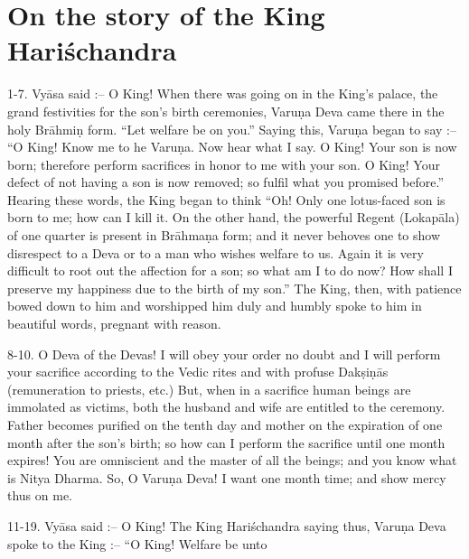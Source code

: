 \chapter{On the story of the King Hari\'schandra}

1-7. Vy\=asa said :-- O King! When there was going on in the King's palace, the grand festivities for the son's birth ceremonies, Varu\d{n}a Deva came there in the holy Br\=ahmi\d{n} form. ``Let welfare be on you.'' Saying this, Varu\d{n}a began to say :-- ``O King! Know me to he Varu\d{n}a. Now hear what I say. O King! Your son is now born; therefore perform sacrifices in honor to me with your son. O King! Your defect of not having a son is now removed; so fulfil what you promised before.'' Hearing these words, the King began to think ``Oh! Only one lotus-faced son is born to me; how can I kill it. On the other hand, the powerful Regent (Lokap\=ala) of one quarter is present in Br\=ahma\d{n}a form; and it never behoves one to show disrespect to a Deva or to a man who wishes welfare to us. Again it is very difficult to root out the affection for a son; so what am I to do now? How shall I preserve my happiness due to the birth of my son.'' The King, then, with patience bowed down to him and worshipped him duly and humbly spoke to him in beautiful words, pregnant with reason.

8-10. O Deva of the Devas! I will obey your order no doubt and I will perform your sacrifice according to the Vedic rites and with profuse Dak\d{s}i\d{n}\=as (remuneration to priests, etc.) But, when in a sacrifice human beings are immolated as victims, both the husband and wife are entitled to the ceremony. Father becomes purified on the tenth day and mother on the expiration of one month after the son's birth; so how can I perform the sacrifice until one month expires! You are omniscient and the master of all the beings; and you know what is Nitya Dharma. So, O Varu\d{n}a Deva! I want one month time; and show mercy thus on me.

11-19. Vy\=asa said :-- O King! The King Hari\'schandra saying thus, Varu\d{n}a Deva spoke to the King :-- ``O King! Welfare be unto

